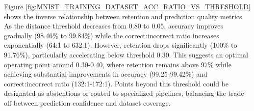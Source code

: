






\noindent Figure \ref{fig:MNIST_TRAINING_DATASET_ACC_RATIO_VS_THRESHOLD} shows the inverse relationship between retention and prediction quality metrics. As the distance threshold decreases from 0.80 to 0.05, accuracy improves gradually (98.46\% to 99.84\%) while the correct:incorrect ratio increases exponentially (64:1 to 632:1). However, retention drops significantly (100\% to 91.76\%), particularly accelerating below threshold 0.30. This suggests an optimal operating point around 0.30-0.40, where retention remains above 97\% while achieving substantial improvements in accuracy (99.25-99.42\%) and correct:incorrect ratio (132:1-172:1). Points beyond this threshold could be designated as abstentions or routed to specialized pipelines, balancing the trade-off between prediction confidence and dataset coverage.

